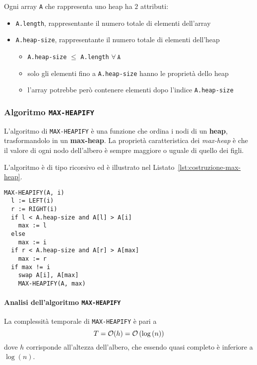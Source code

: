 \documentclass[italian, 10pt]{article}
\begin{document}
Ogni array \texttt{A} che rappresenta uno heap ha \(2\) attributi:

\begin{itemize}
  \item \texttt{A.length}, rappresentante il numero totale di elementi dell'array
  \item \texttt{A.heap-size}, rappresentante il numero totale di elementi dell'heap
        \begin{itemize}
          \item \texttt{A.heap-size} \(\leq\) \texttt{A.length} \(\forall \, \texttt{A}\)
          \item solo gli elementi fino a \texttt{A.heap-size} hanno le proprietà dello heap
          \item l'array potrebbe però contenere elementi dopo l'indice \texttt{A.heap-size}
        \end{itemize}
\end{itemize}

\subsubsection{Algoritmo \texttt{MAX-HEAPIFY}}
\label{sec:algoritmo-max-heapify}

L'algoritmo di \texttt{MAX-HEAPIFY} è una funzione che ordina i nodi di un \textbf{heap}, trasformandolo in un \textbf{max-heap}.
La proprietà caratteristica dei \textit{max-heap} è che il valore di ogni nodo dell'albero è sempre maggiore o uguale di quello dei figli.

L'algoritmo è di tipo ricorsivo ed è illustrato nel Listato~\ref{lst:costruzione-max-heap}.

\begin{lstlisting}[float, style=pseudocode, caption={Costruzione di un \texttt{MAX-HEAP}}, label={lst:costruzione-max-heap}]
MAX-HEAPIFY(A, i)
  l := LEFT(i)
  r := RIGHT(i)
  if l < A.heap-size and A[l] > A[i]
    max := l
  else
    max := i
  if r < A.heap-size and A[r] > A[max]
    max := r
  if max != i
    swap A[i], A[max]
    MAX-HEAPIFY(A, max)
\end{lstlisting}

\paragraph{Analisi dell'algoritmo \texttt{MAX-HEAPIFY}}

La complessità temporale di \texttt{MAX-HEAPIFY} è pari a
\[ T = \mathcal{O}(h) = \mathcal{O}\left(\log{(n)}\right) \]
dove \(h\) corrisponde all'altezza dell'albero, che essendo quasi completo è inferiore a \(\log{(n)}\).
\end{document}
